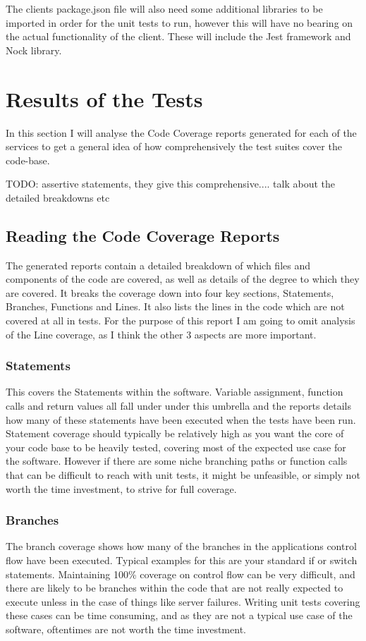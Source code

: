 The clients package.json file will also need some additional libraries to be imported in order for the unit tests to run, however this will have no bearing on the actual functionality of the client. These will include the Jest framework and Nock library.
\section{Results of the Tests}
In this section I will analyse the Code Coverage reports generated for each of the services to get a general idea of how comprehensively the test suites  cover the code-base.

TODO: assertive statements, they give this comprehensive.... talk about the detailed breakdowns etc
\FloatBarrier
\subsection{Reading the Code Coverage Reports}
The generated reports contain a detailed breakdown of which files and components of the code are covered, as well as details of the degree to which they are covered. It breaks the coverage down into four key sections, Statements, Branches, Functions and Lines. It also lists the lines in the code which are not covered at all in tests. For the purpose of this report I am going to omit analysis of the Line coverage, as I think the other 3 aspects are more important.
\subsubsection{Statements}
This covers the Statements within the software. Variable assignment, function calls and return values all fall under under this umbrella and the reports details how many of these statements have been executed when the tests have been run. Statement coverage should typically be relatively high as you want the core of your code base to be heavily tested, covering most of the expected use case for the software. However if there are some niche branching paths or function calls that can be difficult to reach with unit tests, it might be unfeasible, or simply not worth the time investment, to strive for full coverage.
\subsubsection{Branches}
The branch coverage shows how many of the branches in the applications control flow have been executed. Typical examples for this are your standard if or switch statements. Maintaining 100\% coverage on control flow can be very difficult, and there are likely to be branches within the code that are not really expected to execute unless in the case of things like server failures. Writing unit tests covering these cases can be time consuming, and as they are not a typical use case of the software, oftentimes are not worth the time investment.
